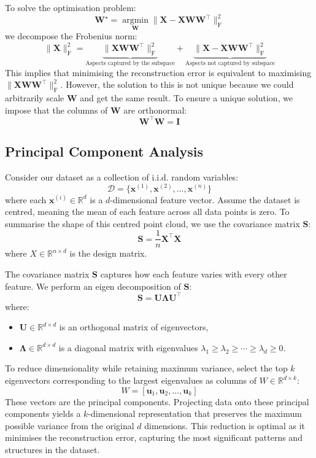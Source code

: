 To solve the optimisation problem:
\[
    \bm{W}^{\star} = \underset{\bm{W}}{\operatorname{argmin}} \| \bm{X} - \bm{X}\bm{W}\bm{W}^\top \|_{\mathrm{F}}^{2}
\]
we decompose the Frobenius norm:
\[
    \|\bm{X}\|_{\mathrm{F}}^{2} = \underbrace{\|\bm{X}\bm{W}\bm{W}^\top\|_{\mathrm{F}}^{2}}_{\text{Aspects captured by the subspace}} + \underbrace{\|\bm{X} - \bm{X}\bm{W}\bm{W}^\top\|_{\mathrm{F}}^{2}}_{\text{Aspects not captured by subspace}}
\]
This implies that minimising the reconstruction error is equivalent to maximising $\|\bm{X}\bm{W}\bm{W}^\top\|_{\mathrm{F}}^{2}$. However, the solution to this is not unique because we could arbitrarily scale $\bm{W}$ and get the same result. To ensure a unique solution, we impose that the columns of $\bm{W}$ are orthonormal:
\[
    \bm{W}^\top \bm{W} = \mathbf{I}
\]

\subsection{Principal Component Analysis}

Consider our dataset as a collection of i.i.d. random variables:
\[
    \mathcal{D} = \{\mathbf{x}^{(1)}, \mathbf{x}^{(2)}, \ldots, \mathbf{x}^{(n)}\}
\]
where each $\mathbf{x}^{(i)} \in \mathbb{R}^{d}$ is a $d$-dimensional feature vector. Assume the dataset is centred, meaning the mean of each feature across all data points is zero. To summarise the shape of this centred point cloud, we use the covariance matrix $\bm{S}$:
\[
    \bm{S} = \frac{1}{n} \bm{X}^\top \bm{X}
\]
where $X \in \mathbb{R}^{n \times d}$ is the design matrix. \bigskip

The covariance matrix $\bm{S}$ captures how each feature varies with every other feature. We perform an eigen decomposition of $\bm{S}$:
\[
    \bm{S} = \bm{U} \bm{\Lambda} \bm{U}^\top
\]
where:
\begin{itemize}
    \item $\bm{U} \in \mathbb{R}^{d \times d}$ is an orthogonal matrix of eigenvectors,
    \item $\bm{\Lambda} \in \mathbb{R}^{d \times d}$ is a diagonal matrix with eigenvalues $\lambda_{1} \geq \lambda_{2} \geq \cdots \geq \lambda_{d} \geq 0$.
\end{itemize}

To reduce dimensionality while retaining maximum variance, select the top $k$ eigenvectors corresponding to the largest eigenvalues as columns of $W \in \mathbb{R}^{d \times k}$:
\[
    W = [\mathbf{u}_1, \mathbf{u}_2, \ldots, \mathbf{u}_k]
\]
These vectors are the principal components. Projecting data onto these principal components yields a $k$-dimensional representation that preserves the maximum possible variance from the original $d$ dimensions. This reduction is optimal as it minimises the reconstruction error, capturing the most significant patterns and structures in the dataset.

